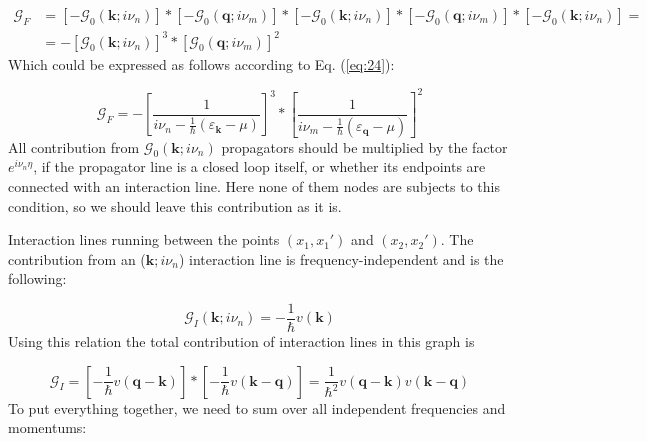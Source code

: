 \begin{align} \label{eq:25}
\mathcal{G}_{F}
&=
\left[ - \mathcal{G}_{0} \left( \boldsymbol{k}; i \nu_{n} \right) \right]
*
\left[ - \mathcal{G}_{0} \left( \boldsymbol{q}; i \nu_{m} \right) \right]
*
\left[ - \mathcal{G}_{0} \left( \boldsymbol{k}; i \nu_{n} \right) \right]
*
\left[ - \mathcal{G}_{0} \left( \boldsymbol{q}; i \nu_{m} \right) \right]
*
\left[ - \mathcal{G}_{0} \left( \boldsymbol{k}; i \nu_{n} \right) \right]
= \nonumber \\
&=
- \left[ \mathcal{G}_{0} \left( \boldsymbol{k}; i \nu_{n} \right) \right]^{3}
*
\left[ \mathcal{G}_{0} \left( \boldsymbol{q}; i \nu_{m} \right) \right]^{2}
\end{align}
Which could be expressed as follows according to Eq. (\ref{eq:24}):

\begin{equation} \label{eq:26}
\mathcal{G}_{F}
=
- \left[
\frac{1}{i \nu_{n} - \frac{1}{\hbar} \left( \varepsilon_{\boldsymbol{k}} - \mu \right)}
\right]^{3}
*
\left[
\frac{1}{i \nu_{m} - \frac{1}{\hbar} \left( \varepsilon_{\boldsymbol{q}} - \mu \right)}
\right]^{2}
\end{equation}
All contribution from $\mathcal{G}_{0} \left( \boldsymbol{k}; i \nu_{n} \right)$ propagators should be multiplied by the factor $e^{i \nu_{n} \eta}$, if the propagator line is a closed loop itself, or whether its endpoints are connected with an interaction line. Here none of them nodes are subjects to this condition, so we should leave this contribution as it is. \par
Interaction lines running between the points $\left( x_{1}, x_{1}' \right)$ and $\left( x_{2}, x_{2}' \right)$. The contribution from an ($\boldsymbol{k}; i \nu_{n}$) interaction line is frequency-independent and is the following:

\begin{equation} \label{eq:27}
\mathcal{G}_{I} \left( \boldsymbol{k}; i \nu_{n} \right)
=
- \frac{1}{\hbar} v \left( \boldsymbol{k} \right)
\end{equation}
Using this relation the total contribution of interaction lines in this graph is

\begin{equation} \label{eq:28}
\mathcal{G}_{I}
=
\left[ - \frac{1}{\hbar} v \left( \boldsymbol{q} - \boldsymbol{k} \right) \right]
*
\left[ - \frac{1}{\hbar} v \left( \boldsymbol{k} - \boldsymbol{q} \right) \right]
=
\frac{1}{\hbar^{2}} v \left( \boldsymbol{q} - \boldsymbol{k} \right) v \left( \boldsymbol{k} - \boldsymbol{q} \right)
\end{equation}
To put everything together, we need to sum over all independent frequencies and momentums:

